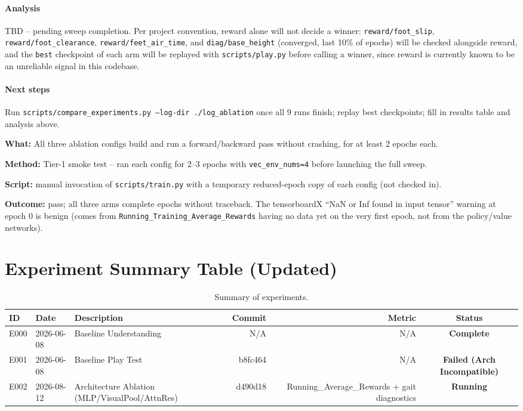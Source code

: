\documentclass{article}
\begin{document}
\paragraph{Analysis}
TBD -- pending sweep completion. Per project convention, reward alone will
not decide a winner: \texttt{reward/foot\_slip}, \texttt{reward/foot\_clearance},
\texttt{reward/feet\_air\_time}, and \texttt{diag/base\_height} (converged,
last 10\% of epochs) will be checked alongside reward, and the \texttt{best}
checkpoint of each arm will be replayed with \texttt{scripts/play.py} before
calling a winner, since reward is currently known to be an unreliable signal
in this codebase.

\paragraph{Next steps}
Run \texttt{scripts/compare\_experiments.py --log-dir ./log\_ablation} once
all 9 runs finish; replay best checkpoints; fill in results table and analysis
above.

\begin{verification}
\textbf{What:} All three ablation configs build and run a forward/backward
pass without crashing, for at least 2 epochs each.

\textbf{Method:} Tier-1 smoke test -- ran each config for 2--3 epochs with
\texttt{vec\_env\_nums=4} before launching the full sweep.

\textbf{Script:} manual invocation of \texttt{scripts/train.py} with a
temporary reduced-epoch copy of each config (not checked in).

\textbf{Outcome:} pass; all three arms complete epochs without traceback.
The tensorboardX ``NaN or Inf found in input tensor'' warning at epoch 0 is
benign (comes from \texttt{Running\_Training\_Average\_Rewards} having no
data yet on the very first epoch, not from the policy/value networks).
\end{verification}

\section{Experiment Summary Table (Updated)}
\begin{table}[h!]
\centering
\setlength{\tabcolsep}{8pt}
\renewcommand{\arraystretch}{1.2}
\begin{tabular}{lllrrc}
\toprule
ID & Date & Description & Commit & Metric & Status \\
\midrule
E000 & 2026-06-08 & Baseline Understanding & N/A & N/A & \textbf{Complete} \\
E001 & 2026-06-08 & Baseline Play Test & b8fc464 & N/A & \textbf{Failed (Arch Incompatible)} \\
E002 & 2026-08-12 & Architecture Ablation (MLP/VisualPool/AttnRes) & d490d18 & Running\_Average\_Rewards + gait diagnostics & \textbf{Running} \\
\bottomrule
\end{tabular}
\caption{Summary of experiments.}
\end{table}
\end{document}
